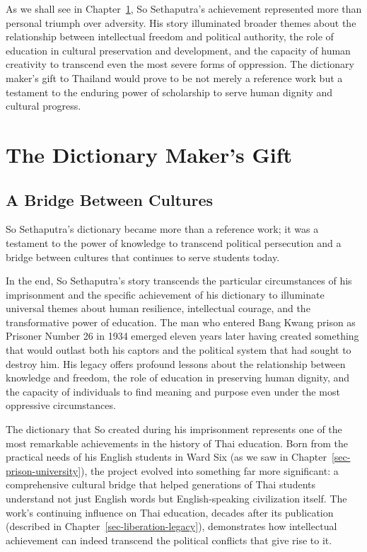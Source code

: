 \documentclass[
  Letterpaper,
]{scrbook}
\begin{document}
As we shall see in Chapter~\ref{sec-dictionary-makers-gift}, So
Sethaputra's achievement represented more than personal triumph over
adversity. His story illuminated broader themes about the relationship
between intellectual freedom and political authority, the role of
education in cultural preservation and development, and the capacity of
human creativity to transcend even the most severe forms of oppression.
The dictionary maker's gift to Thailand would prove to be not merely a
reference work but a testament to the enduring power of scholarship to
serve human dignity and cultural progress.


\chapter{The Dictionary Maker's Gift}\label{sec-dictionary-makers-gift}

\section{A Bridge Between Cultures}\label{a-bridge-between-cultures}

So Sethaputra's dictionary became more than a reference work; it was a
testament to the power of knowledge to transcend political persecution
and a bridge between cultures that continues to serve students today.

In the end, So Sethaputra's story transcends the particular
circumstances of his imprisonment and the specific achievement of his
dictionary to illuminate universal themes about human resilience,
intellectual courage, and the transformative power of education. The man
who entered Bang Kwang prison as Prisoner Number 26 in 1934 emerged
eleven years later having created something that would outlast both his
captors and the political system that had sought to destroy him. His
legacy offers profound lessons about the relationship between knowledge
and freedom, the role of education in preserving human dignity, and the
capacity of individuals to find meaning and purpose even under the most
oppressive circumstances.

The dictionary that So created during his imprisonment represents one of
the most remarkable achievements in the history of Thai education. Born
from the practical needs of his English students in Ward Six (as we saw
in Chapter~\ref{sec-prison-university}), the project evolved into
something far more significant: a comprehensive cultural bridge that
helped generations of Thai students understand not just English words
but English-speaking civilization itself. The work's continuing
influence on Thai education, decades after its publication (described in
Chapter~\ref{sec-liberation-legacy}), demonstrates how intellectual
achievement can indeed transcend the political conflicts that give rise
to it.
\end{document}
